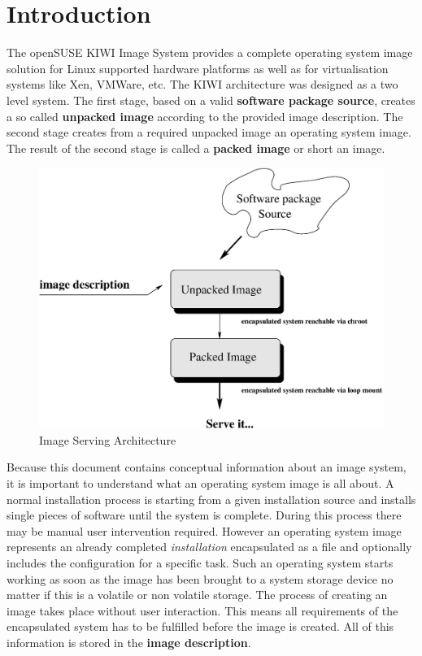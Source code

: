 \chapter{Introduction}

The openSUSE KIWI Image System provides a complete operating system
image solution for Linux supported hardware platforms as well as
for virtualisation systems like Xen, VMWare, etc. The KIWI architecture
was designed as a two level system. The first stage, based on a valid
\textbf{software package source}, creates a so called \textbf{unpacked image}
according to the provided image description. The second stage creates from
a required unpacked image an operating system image. The result of the
second stage is called a \textbf{packed image} or short an image.

\begin{figure}[h]
\centering
\includegraphics[scale=0.5]{pictures/intro.eps}
\caption{Image Serving Architecture}
\label{fig:architecture}
\end{figure}

Because this document contains conceptual information about an image system,
it is important to understand what an operating system image is all about.
A normal installation process is starting from a given installation source
and installs single pieces of software until the system is complete. During
this process there may be manual user intervention required. However an
operating system image represents an already completed \textit{installation}
encapsulated as a file and optionally includes the configuration for a
specific task. Such an operating system starts working as soon as the
image has been brought to a system storage device no matter if this is a
volatile or non volatile storage. The process of creating an image takes
place without user interaction.
This means all requirements of the encapsulated system has to be fulfilled
before the image is created. All of this information is stored in the
\textbf{image description}.

